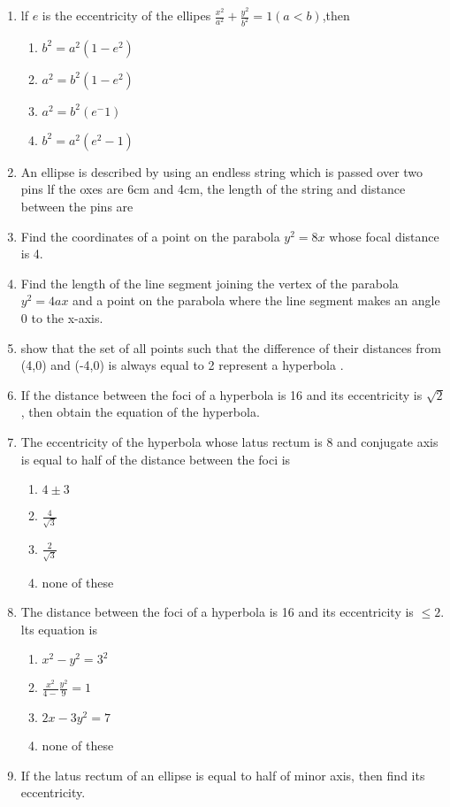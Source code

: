\begin{enumerate}[label=\thesubsection.\arabic*,ref=\thesubsection.\theenumi]
\item lf $e$ is the eccentricity of the ellipes $\frac{x^2}{a^2}+\frac{y^2}{b^2}=1(a<b)$,then
\begin{enumerate}
\item $b^2=a^2(1-e^2)$
\item $a^2=b^2(1-e^2)$
\item $a^2=b^2(e^-1)$
\item $b^2=a^2(e^2-1)$
\end{enumerate}
\item An ellipse is described by using an endless string which is passed over two pins lf the oxes are 6cm and 4cm, the length of the string and distance between the pins are  \makebox[1cm]{\hrulefill}             
 \item Find the coordinates of a point on the parabola $y^2=8x$ whose focal distance is 4.
 \item Find the length of the line segment joining the vertex of the parabola $y^2=4ax$ and a point on the parabola where the line segment makes an angle 0 to the x-axis.
\item show that the set of all points such that the difference of their distances from (4,0) and (-4,0) is always equal to 2 represent a hyperbola .
\item If the distance between the foci of a hyperbola is 16 and its eccentricity is $\sqrt{2}$, then obtain the equation of the hyperbola.
\item The eccentricity of the hyperbola whose latus rectum is 8 and conjugate axis is equal to half of the distance between the foci is 
\begin{enumerate}
\item $4\pm3$
\item $\frac{4}{\sqrt{3}}$
\item $\frac{2}{\sqrt{3}}$
\item none of these
\end{enumerate}
\item The distance between the foci of a hyperbola is 16 and its eccentricity is $\le{2}$. lts equation is
\begin{enumerate}
\item $x^2-y^2=3^2$
\item $\frac{x^2}{4-}\frac{y^2}{9}=1$
\item $2x-3y^2=7$
 \item none of these
 \end{enumerate}
 \item If the latus rectum of an ellipse is equal to half of minor axis, then find its eccentricity.

\end{enumerate}
